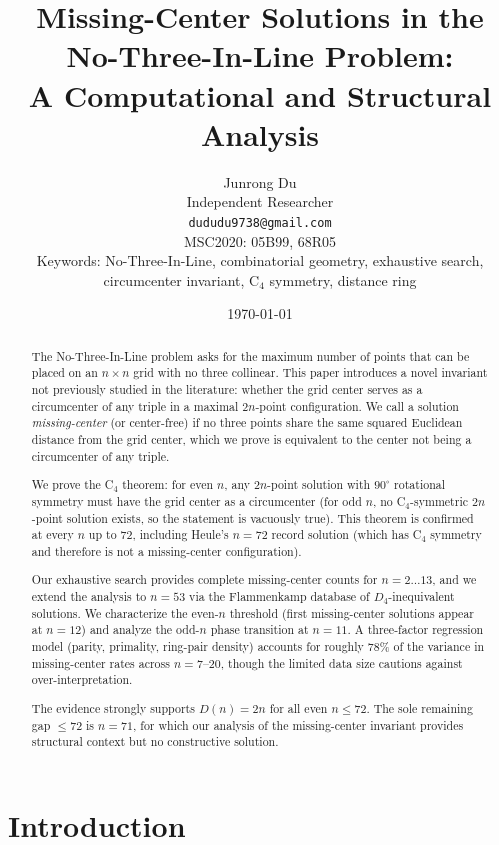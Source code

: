 \documentclass[11pt,a4paper]{article}
\title{\vspace{-1.5cm}\textbf{Missing-Center Solutions in the\\No-Three-In-Line Problem:\\
A Computational and Structural Analysis}}
\author{Junrong Du\\
\small Independent Researcher\\
\small \texttt{dududu9738@gmail.com}\\[4pt]
\small MSC2020: 05B99, 68R05\\
\small Keywords: No-Three-In-Line, combinatorial geometry, exhaustive search,\\
\small \hspace*{1.85cm}circumcenter invariant, C$_4$ symmetry, distance ring}
\date{\small \today}
\theoremstyle{plain}
\theoremstyle{definition}
\begin{document}
\maketitle
\thispagestyle{firstpage}

\begin{abstract}
The No-Three-In-Line problem asks for the maximum number of points that can be placed on an $n\times n$ grid with no three collinear. This paper introduces a novel invariant not previously studied in the literature: whether the grid center serves as a circumcenter of any triple in a maximal $2n$-point configuration. We call a solution \emph{missing-center} (or center-free) if no three points share the same squared Euclidean distance from the grid center, which we prove is equivalent to the center not being a circumcenter of any triple.

We prove the C$_4$ theorem: for even $n$, any $2n$-point solution with $90^\circ$ rotational symmetry must have the grid center as a circumcenter (for odd $n$, no C$_4$-symmetric $2n$-point solution exists, so the statement is vacuously true). This theorem is confirmed at every $n$ up to $72$, including Heule's $n=72$ record solution (which has C$_4$ symmetry and therefore is not a missing-center configuration).

Our exhaustive search provides complete missing-center counts for $n=2\dots13$, and we extend the analysis to $n=53$ via the Flammenkamp database of $D_4$-inequivalent solutions. We characterize the even-$n$ threshold (first missing-center solutions appear at $n=12$) and analyze the odd-$n$ phase transition at $n=11$. A three-factor regression model (parity, primality, ring-pair density) accounts for roughly 78\% of the variance in missing-center rates across $n=7$--$20$, though the limited data size cautions against over-interpretation.

The evidence strongly supports $D(n)=2n$ for all even $n\le 72$. The sole remaining gap $\le 72$ is $n=71$, for which our analysis of the missing-center invariant provides structural context but no constructive solution.
\end{abstract}

\section{Introduction}
\label{sec:intro}
\end{document}
